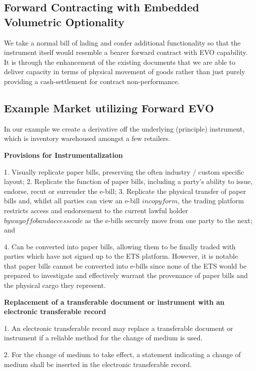 \subsection{ Forward Contracting with Embedded Volumetric Optionality}

We take a normal bill of lading and confer additional functionality so that the instrument itself would resemble a bearer forward contract with EVO capability. It is through the enhancement of the existing documents that we are able to deliver capacity in terms of physical movement of goods rather than just purely providing a cash-settlement for contract non-performance. 

\subsection{Example Market utilizing Forward EVO}

In our example we create a derivative off the underlying (principle) instrument, which is inventory warehoused amongst a few retailers.



\textbf{Provisions for Instrumentalization}

1. Visually replicate paper bills, preserving the often industry / custom specific layout;
2. Replicate the function of paper bills, including a party’s ability to issue, endorse, recut or surrender the e-bill;
3. Replicate the physical transfer of paper bills and, whilst all parties can view an e-bill \(in copy form\), the trading platform restricts access and endorsement to the current lawful holder \(by way of fob and access code\) as the e-bills securely move from one party to the next; and

4. Can be converted into paper bills, allowing them to be finally traded with parties which have not signed up to the ETS platform. However, it is notable that paper bills cannot be converted into e-bills since none of the ETS would be prepared to investigate and effectively warrant the provenance of paper bills and the physical cargo they represent.

 \textbf{Replacement of a transferable document or instrument with an electronic transferable record}

1. An electronic transferable record may replace a transferable document or instrument if a reliable method for the change of medium is used.

2. For the change of medium to take effect, a statement indicating a change of medium shall be inserted in the electronic transferable record.

